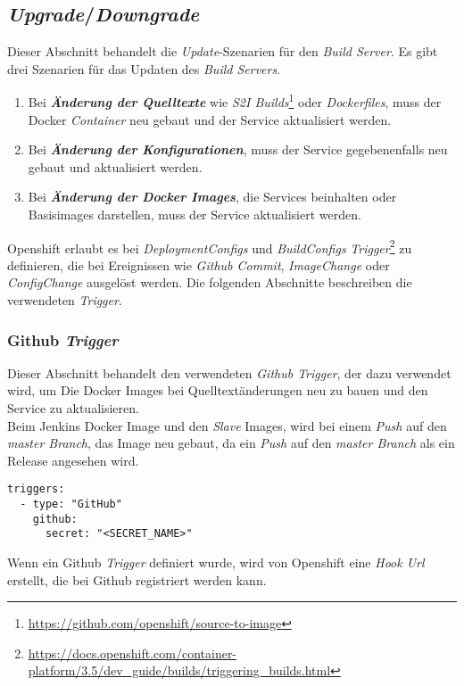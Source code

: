 \subsection{\emph{Upgrade}/\emph{Downgrade}}
\label{sec:buildserver-updates}
Dieser Abschnitt behandelt die \emph{Update}-Szenarien für den \emph{Build Server}. Es gibt drei Szenarien für das Updaten des \emph{Build Servers}.
\begin{enumerate}
	\item Bei \textbf{\emph{Änderung der Quelltexte}} wie \emph{S2I Builds}\footnote{\url{https://github.com/openshift/source-to-image}} oder \emph{Dockerfiles}, muss der Docker \emph{Container} neu gebaut und der Service aktualisiert werden.
	\item Bei \textbf{\emph{Änderung der Konfigurationen}}, muss der Service gegebenenfalls neu gebaut und aktualisiert werden.
	\item Bei \textbf{\emph{Änderung der Docker Images}}, die Services beinhalten oder Basisimages darstellen, muss der Service aktualisiert werden.
\end{enumerate}

Openshift erlaubt es bei \emph{DeploymentConfigs} und \emph{BuildConfigs} \emph{Trigger}\footnote{\url{https://docs.openshift.com/container-platform/3.5/dev_guide/builds/triggering_builds.html}} zu definieren, die bei Ereignissen wie \emph{Github Commit}, \emph{ImageChange} oder \emph{ConfigChange} ausgelöst werden. Die folgenden Abschnitte beschreiben die verwendeten \emph{Trigger}.

\subsubsection{Github \emph{Trigger}}
Dieser Abschnitt behandelt den verwendeten \emph{Github Trigger}, der dazu verwendet wird, um Die Docker Images bei Quelltextänderungen neu zu bauen und den Service zu aktualisieren.\\

Beim Jenkins Docker Image und den \emph{Slave} Images, wird bei einem \emph{Push} auf den \emph{master Branch}, das Image neu gebaut, da ein \emph{Push} auf den \emph{master Branch} als ein Release angesehen wird.

\begin{verbatim}
triggers:
  - type: "GitHub"
    github:
      secret: "<SECRET_NAME>"
\end{verbatim}
Wenn ein Github \emph{Trigger} definiert wurde, wird von Openshift eine \emph{Hook Url} erstellt, die bei Github registriert werden kann.


